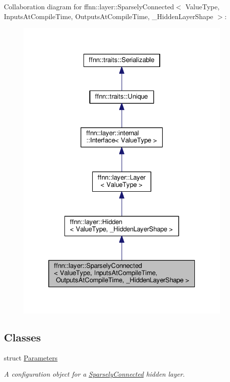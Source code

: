 Collaboration diagram for ffnn\-:\-:layer\-:\-:Sparsely\-Connected$<$ Value\-Type, Inputs\-At\-Compile\-Time, Outputs\-At\-Compile\-Time, \-\_\-\-Hidden\-Layer\-Shape $>$\-:
\nopagebreak
\begin{figure}[H]
\begin{center}
\leavevmode
\includegraphics[width=302pt]{classffnn_1_1layer_1_1_sparsely_connected__coll__graph}
\end{center}
\end{figure}
\subsection*{Classes}
\begin{DoxyCompactItemize}
\item 
struct \hyperlink{structffnn_1_1layer_1_1_sparsely_connected_1_1_parameters}{Parameters}
\begin{DoxyCompactList}\small\item\em A configuration object for a \hyperlink{classffnn_1_1layer_1_1_sparsely_connected}{Sparsely\-Connected} hidden layer. \end{DoxyCompactList}\end{DoxyCompactItemize}
